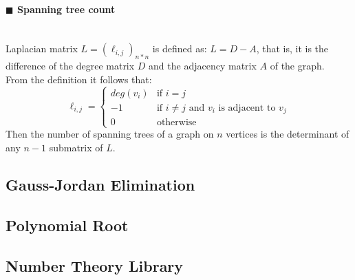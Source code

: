 \documentclass[10pt]{article}
\begin{document}
\paragraph{$\blacksquare$ Spanning tree count}
\noindent \\
Laplacian matrix $L=(\ell_{i,j})_{n*n}$ is defined as: $L=D-A$, that is, it is the difference of the degree matrix $D$ and the adjacency matrix $A$ of the graph. \\
From the definition it follows that:
\begin{displaymath}
\ell_{i,j}=
\left\{ \begin{array}{ll}
deg(v_i) & \textrm{if } i=j \\
-1 & \textrm{if }i\ne j\textrm{ and }v_i\textrm{ is adjacent to }v_j \\
0 & \textrm{otherwise}
\end{array} \right.
\end{displaymath}
Then the number of spanning trees of a graph on $n$ vertices is the determinant of any $n-1$ submatrix of $L$.
\subsection{Gauss-Jordan Elimination}

\subsection{Polynomial Root}

\subsection{Number Theory Library}

\end{document}
